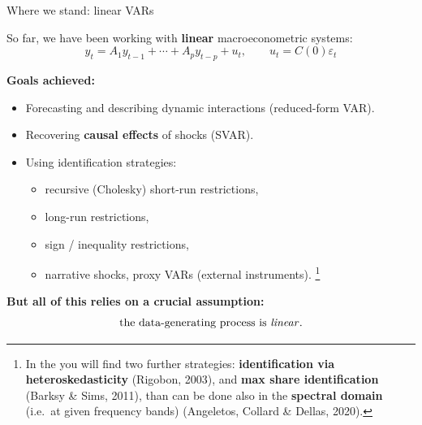 \documentclass{beamer}
\begin{document}
\begin{frame}{Where we stand: linear VARs}
\footnotesize

So far, we have been working with \textbf{linear} macroeconometric systems:
\[
y_t = A_1 y_{t-1} + \cdots + A_p y_{t-p} + u_t,
\qquad u_t = C(0)\varepsilon_t
\]

\medskip
\textbf{Goals achieved:}
\begin{itemize}
  \item Forecasting and describing dynamic interactions (reduced-form VAR).
  \item Recovering \textbf{causal effects} of shocks (SVAR).
  \item Using identification strategies:
  \begin{itemize}
    \item recursive (Cholesky) short-run restrictions,
    \item long-run restrictions,
    \item sign / inequality restrictions,
    \item narrative shocks, proxy VARs (external instruments).%
    \footnote{\scriptsize In the \textbf{\Appendix} you will find two further strategies: \textbf{identification via heteroskedasticity} (Rigobon, 2003), and \textbf{max share identification} (Barksy \& Sims, 2011), than can be done also in the \textbf{spectral domain} (i.e.\ at given frequency bands) (Angeletos, Collard \& Dellas, 2020).}
  \end{itemize}
\end{itemize}

\medskip
\textbf{But all of this relies on a crucial assumption:}\\
\[
\text{{the data-generating process is \emph{linear}}}.
\]

\end{frame}
\end{document}
